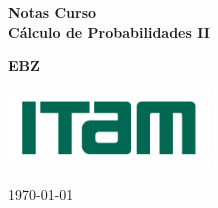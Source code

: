
\begin{titlepage}
    \begin{center}
    	
    	\vspace*{1cm} 
   
        

    \colorbox{antiflashwhite}{
	  \parbox[t]{1.0\linewidth}{
		\centering \fontsize{30pt}{40pt}\selectfont %
		
		
		\vspace{1.5cm}
		{ \bfseries Notas Curso } \\
		\vspace{1cm}
		{ \bfseries Cálculo de Probabilidades II} \\
    \vspace*{1.5cm} 	
		
	}
}        
        
     \vspace{7cm}
     {\bfseries EBZ} \\
		  \vspace{1cm}
	
	
	   {\centering \large 
      \medskip
      \includegraphics[width = 0.4\textwidth]{logos/itam.png} \\
      }
    
     
     
     \vspace{1cm}
     
     {\centering \LARGE 
     \today \\
     }

    \vfill
        
    \end{center}
\end{titlepage}

\tableofcontents

\vspace{1cm}